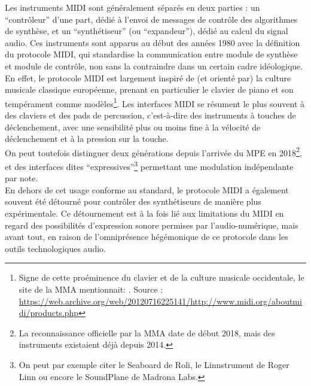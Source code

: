 \noindent Les instruments \gls{MIDI} sont généralement séparés en deux parties : un ``contrôleur'' d'une part, dédié à l'envoi de messages de contrôle des algorithmes de synthèse, et un ``synthétiseur'' (ou ``expandeur''), dédié au calcul du signal audio. Ces instruments sont apparus au début des années 1980 avec la définition du protocole \gls{MIDI}, qui standardise la communication entre module de synthèse et module de contrôle, non sans la contraindre dans un certain cadre idéologique. En effet, le protocole \gls{MIDI} est largement inspiré de (et orienté par) la culture musicale classique européenne, prenant en particulier le clavier de piano et son tempérament comme modèles\footnote{Signe de cette proéminence du clavier et de la culture musicale occidentale, le site de la \gls{MMA} mentionnait: . Source : \url{https://web.archive.org/web/20120716225141/http://www.midi.org/aboutmidi/products.php}}. Les interfaces \gls{MIDI} se résument le plus souvent à des claviers et des pads de percussion, c'est-à-dire des instruments à touches de déclenchement, avec une sensibilité plus ou moins fine à la vélocité de déclenchement et à la pression sur la touche.\\
\indent On peut toutefois distinguer deux générations depuis l'arrivée du \gls{MPE} en 2018\footnote{La reconnaissance officielle par la \gls{MMA} date de début 2018, mais des instruments existaient déjà depuis 2014.}, et des interfaces dites ``expressives''\footnote{On peut par exemple citer le Seaboard de Roli, le Linnstrument de Roger Linn ou encore le SoundPlane de Madrona Labs.} permettant une modulation indépendante par note.\\
\indent En dehors de cet usage conforme au standard, le protocole \gls{MIDI} a également souvent été détourné pour contrôler des synthétiseurs de manière plus expérimentale. Ce détournement est à la fois lié aux limitations du \gls{MIDI} en regard des possibilités d'expression sonore permises par l'audio-numérique, mais avant tout, en raison de l'omniprésence hégémonique de ce protocole dans les outils technologiques audio.

